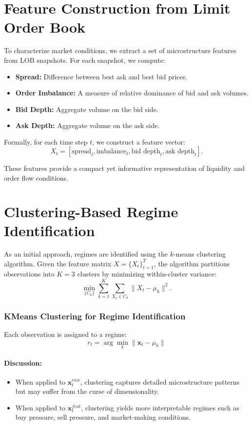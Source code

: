 \documentclass[12pt,a4paper]{report}
\begin{document}
\section{Feature Construction from Limit Order Book}

To characterize market conditions, we extract a set of microstructure features from LOB snapshots. For each snapshot, we compute:

\begin{itemize}
    \item \textbf{Spread:} Difference between best ask and best bid prices.
    \item \textbf{Order Imbalance:} A measure of relative dominance of bid and ask volumes.
    \item \textbf{Bid Depth:} Aggregate volume on the bid side.
    \item \textbf{Ask Depth:} Aggregate volume on the ask side.
\end{itemize}

Formally, for each time step $t$, we construct a feature vector:
\[
X_t = [\text{spread}_t, \text{imbalance}_t, \text{bid depth}_t, \text{ask depth}_t].
\]

These features provide a compact yet informative representation of liquidity and order flow conditions.

\section{Clustering-Based Regime Identification}

As an initial approach, regimes are identified using the $k$-means clustering algorithm. Given the feature matrix $X = \{X_t\}_{t=1}^T$, the algorithm partitions observations into $K=3$ clusters by minimizing within-cluster variance:
\[
\min_{\{C_k\}} \sum_{k=1}^{K} \sum_{X_t \in C_k} \| X_t - \mu_k \|^2.
\]


\subsubsection{KMeans Clustering for Regime Identification}

Each observation is assigned to a regime:
\begin{equation}
    r_t = \arg\min_k \|\mathbf{x}_t - \mu_k\|
\end{equation}

\paragraph{Discussion:}
\begin{itemize}
    \item When applied to $\mathbf{x}_t^{raw}$, clustering captures detailed microstructure patterns but may suffer from the curse of dimensionality.
    \item When applied to $\mathbf{x}_t^{feat}$, clustering yields more interpretable regimes such as buy pressure, sell pressure, and market-making conditions.
\end{itemize}
\end{document}
